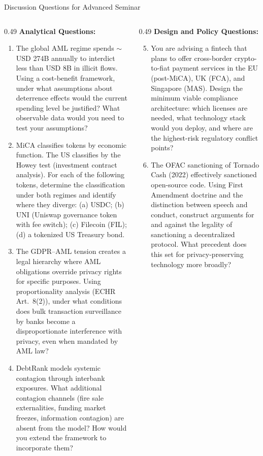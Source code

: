 \begin{frame}{Discussion Questions for Advanced Seminar}
  \begin{columns}[T]
    \begin{column}{0.49\textwidth}
      \textbf{Analytical Questions:}
      \begin{enumerate}
        \item The global AML regime spends $\sim$USD 274B annually to interdict less than USD 8B in illicit flows. Using a cost-benefit framework, under what assumptions about deterrence effects would the current spending level be justified? What observable data would you need to test your assumptions?
        \item MiCA classifies tokens by economic function. The US classifies by the Howey test (investment contract analysis). For each of the following tokens, determine the classification under both regimes and identify where they diverge: (a) USDC; (b) UNI (Uniswap governance token with fee switch); (c) Filecoin (FIL); (d) a tokenized US Treasury bond.
        \item The GDPR--AML tension creates a legal hierarchy where AML obligations override privacy rights for specific purposes. Using proportionality analysis (ECHR Art.\ 8(2)), under what conditions does bulk transaction surveillance by banks become a disproportionate interference with privacy, even when mandated by AML law?
        \item DebtRank models systemic contagion through interbank exposures. What additional contagion channels (fire sale externalities, funding market freezes, information contagion) are absent from the model? How would you extend the framework to incorporate them?
      \end{enumerate}
    \end{column}
    \begin{column}{0.49\textwidth}
      \textbf{Design and Policy Questions:}
      \begin{enumerate}\setcounter{enumi}{4}
        \item You are advising a fintech that plans to offer cross-border crypto-to-fiat payment services in the EU (post-MiCA), UK (FCA), and Singapore (MAS). Design the minimum viable compliance architecture: which licenses are needed, what technology stack would you deploy, and where are the highest-risk regulatory conflict points?
        \item The OFAC sanctioning of Tornado Cash (2022) effectively sanctioned open-source code. Using First Amendment doctrine and the distinction between speech and conduct, construct arguments for and against the legality of sanctioning a decentralized protocol. What precedent does this set for privacy-preserving technology more broadly?

\end{enumerate}
\end{column}
\end{columns}
\end{frame}

